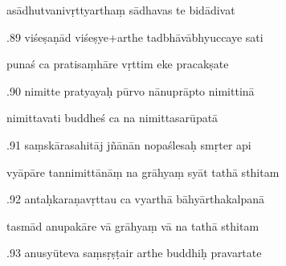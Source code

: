 \documentclass[article,12pt,a4paper]{memoir}%
\newcounter{parCount}
\begin{document}
	  
	  \pstart \leavevmode%
	asādhutvanivṛttyarthaṃ sādhavas te bidādivat 
	{}
	\pend%
      

	  
	  \pstart {}.89 viśeṣaṇād viśeṣye+arthe tadbhāvābhyuccaye sati 
	{}
	\pend%
      

	  
	  \pstart \leavevmode%
	punaś ca pratisaṃhāre vṛttim eke pracakṣate 
	{}
	\pend%
      

	  
	  \pstart {}.90 nimitte pratyayaḥ pūrvo nānuprāpto nimittinā 
	{}
	\pend%
      

	  
	  \pstart \leavevmode%
	nimittavati buddheś ca na nimittasarūpatā 
	{}
	\pend%
      

	  
	  \pstart {}.91 saṃskārasahitāj jñānān nopaślesaḥ smṛter api 
	{}
	\pend%
      

	  
	  \pstart \leavevmode%
	vyāpāre tannimittānāṃ na grāhyaṃ syāt tathā sthitam 
	{}
	\pend%
      

	  
	  \pstart {}.92 antaḥkaraṇavṛttau ca vyarthā bāhyārthakalpanā 
	{}
	\pend%
      

	  
	  \pstart \leavevmode%
	tasmād anupakāre vā grāhyaṃ vā na tathā sthitam 
	{}
	\pend%
      

	  
	  \pstart {}.93 anusyūteva saṃsṛṣṭair arthe buddhiḥ pravartate 
	{}
	\pend%
      
\end{document}
